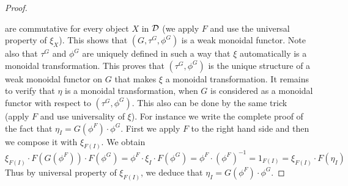 \begin{proof}
\begin{center}
\end{center}
are commutative for every object $X$ in ${\mathcal D}$ (we apply $F$ and use the universal property of $\xi_X$). This shows that $(G,\tau^G,\phi^G)$ is a weak monoidal functor. Note also that $\tau^G$ and $\phi^G$ are uniquely defined in such a way that $\xi$ automatically is a monoidal transformation. This proves that $(\tau^G,\phi^G)$ is the unique structure of a weak monoidal functor on $G$ that makes $\xi$ a monoidal transformation. It remains to verify that $\eta$ is a monoidal transformation, when $G$ is considered as a monoidal functor with respect to $(\tau^G, \phi^G)$. This also can be done by the same trick (apply $F$ and use universality of $\xi$). For instance we write the complete proof of the fact that $\eta_I = G(\phi^F)\cdot \phi^G$. First we apply $F$ to the right hand side and then we compose it with $\xi_{F(I)}$. We obtain
$$\xi_{F(I)}\cdot F(G(\phi^F))\cdot F(\phi^G)= \phi^F\cdot \xi_I\cdot F(\phi^G) = \phi^F\cdot \left(\phi^F\right)^{-1}=1_{F(I)} = \xi_{F(I)}\cdot F(\eta_{I}) $$
Thus by universal property of $\xi_{F(I)}$, we deduce that $\eta_I = G(\phi^F)\cdot \phi^G$.
\end{proof}

